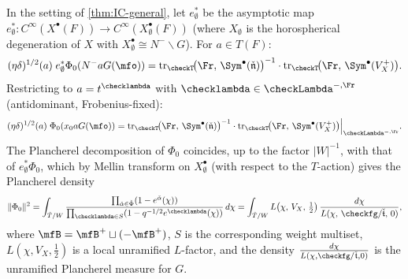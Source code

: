 \begin{corollary}
  In the setting of \cref{thm:IC-general}, let \( e_\emptyset^* \) be the asymptotic map
  \( e_\emptyset^* \colon C^\infty(X^\bullet(F)) \to C^\infty(X_\emptyset^\bullet(F)) \)
  (where \( X_\emptyset \) is the horospherical degeneration of \( X \) with
  \( X_\emptyset^\bullet \cong N^- \backslash G \)).
  For \( a \in T(F) \):
  \[
    (\eta\delta)^{1/2}(a)\; e_\emptyset^* \Phi_0(N^- a G(\mfo))
    =
    \mathrm{tr}_{\checkT}\!\bigl(\Fr,\, \Sym^\bullet(\check{\mathfrak{n}})\bigr)^{-1}
    \cdot \mathrm{tr}_{\checkT}\!\bigl(\Fr,\, \Sym^\bullet(V_X^+)\bigr).
  \]
  Restricting to \( a = t^{\checklambda} \) with
  \( \checklambda \in \checkLambda^{-,\Fr} \) (antidominant, Frobenius-fixed):
  \[
    (\eta\delta)^{1/2}(a)\; \Phi_0(x_0 a G(\mfo))
    =
    \Bigl.\mathrm{tr}_{\checkT}\!\bigl(\Fr,\, \Sym^\bullet(\check{\mathfrak{n}})\bigr)^{-1}
    \cdot \mathrm{tr}_{\checkT}\!\bigl(\Fr,\, \Sym^\bullet(V_X^+)\bigr)
    \Bigr|_{\checkLambda^{-,\Fr}}.
  \]
  The Plancherel decomposition of \( \Phi_0 \) coincides, up to the factor
  \( |W|^{-1} \), with that of \( e_\emptyset^*\Phi_0 \), which by Mellin transform on
  \( X_\emptyset^\bullet \) (with respect to the \( T \)-action) gives the Plancherel
  density
  \begin{equation}
    \label{equation-Plancherel-IC}
    \|\Phi_0\|^2
    = \int_{\hat{T}/W}
        \frac{\prod_{\check\alpha \in \check\Phi}(1 - e^{\check\alpha}(\chi))}
             {\prod_{\checklambda \in S}(1 - q^{-1/2} e^{\checklambda}(\chi))}\, d\chi
    = \int_{\hat{T}/W}
        L\!\left(\chi,\, V_X,\, \tfrac{1}{2}\right)
        \frac{d\chi}{L(\chi,\, \checkfg/\check{\mathfrak{t}},\, 0)},
  \end{equation}
  where \( \mfB = \mfB^+ \sqcup (-\mfB^+) \), \( S \) is the corresponding weight multiset,
  \( L(\chi, V_X, \tfrac{1}{2}) \) is a local unramified \( L \)-factor, and the density
  \( \frac{d\chi}{L(\chi, \checkfg/\check{\mathfrak{t}}, 0)} \) is the unramified
  Plancherel measure for \( G \).
\end{corollary}

